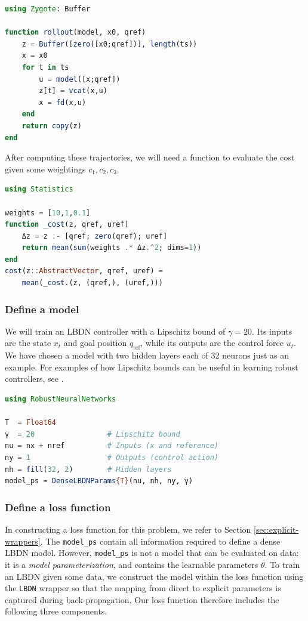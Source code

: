 \begin{lstlisting}[language = Julia]
using Zygote: Buffer

function rollout(model, x0, qref)
    z = Buffer([zero([x0;qref])], length(ts))
    x = x0
    for t in ts
        u = model([x;qref])
        z[t] = vcat(x,u)
        x = fd(x,u)
    end
    return copy(z)
end
\end{lstlisting}

After computing these trajectories, we will need a function to evaluate the cost given some weightings $c_1,c_2,c_3$.
\begin{lstlisting}[language = Julia]
using Statistics

weights = [10,1,0.1]
function _cost(z, qref, uref)
    Δz = z .- [qref; zero(qref); uref]
    return mean(sum(weights .* Δz.^2; dims=1))
end
cost(z::AbstractVector, qref, uref) = 
    mean(_cost.(z, (qref,), (uref,)))
\end{lstlisting}

\subsubsection{Define a model} \label{sec:rl-model}

We will train an LBDN controller with a Lipschitz bound of $\gamma = 20$. Its inputs are the state $x_t$ and goal position $q_\mathrm{ref}$, while its outputs are the control force $u_t$. We have chosen a model with two hidden layers each of 32 neurons just as an example. For examples of how Lipschitz bounds can be useful in learning robust controllers, see \cite{Barbara++2023,Russo+Proutiere2019,Song++2023}.

\begin{lstlisting}[language = Julia]
using RobustNeuralNetworks

T  = Float64
γ  = 20                 # Lipschitz bound
nu = nx + nref          # Inputs (x and reference)
ny = 1                  # Outputs (control action)
nh = fill(32, 2)        # Hidden layers
model_ps = DenseLBDNParams{T}(nu, nh, ny, γ)
\end{lstlisting}

\subsubsection{Define a loss function} \label{sec:rl-loss}

In constructing a loss function for this problem, we refer to Section \ref{sec:explicit-wrappers}. The \verb|model_ps| contain all information required to define a dense LBDN model. However, \verb|model_ps| is not a model that can be evaluated on data: it is a \textit{model parameterization}, and contains the learnable parameters $\theta$. To train an LBDN given some data, we construct the model within the loss function using the \verb|LBDN| wrapper so that the mapping from direct to explicit parameters is captured during back-propagation. Our loss function therefore includes the following three components.

